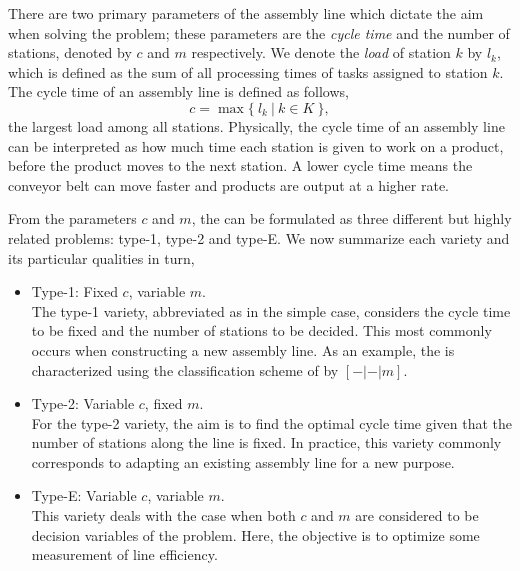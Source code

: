 There are two primary parameters of the assembly line
which dictate the aim when solving the problem; these parameters
are the \emph{cycle time} and the number of stations, denoted
by $c$ and $m$ respectively.
We denote the \emph{load} of station $k$ by $l_k$, which is
defined as the sum of all processing times of tasks assigned to station
$k$.
The cycle time of an assembly line is defined as follows,
\[
	c=\max\{ \: l_k \:|\: k \in K \:\},
\]
\ie the largest load among all stations.
Physically, the cycle time of an assembly
line can be interpreted as how much time each station is given to work on a product,
before the product moves to the next station.
A lower cycle time means the conveyor belt can move faster and
products are output at a higher rate.

From the parameters $c$ and $m$, the \albp{} can be formulated as three 
different but highly related problems: type-1, type-2 and
type-E.
We now summarize each variety and its particular qualities in turn,
\begin{itemize}
	\item Type-1: Fixed $c$, variable $m$.\\[1pt]
	The type-1 variety, abbreviated as  in the simple case, considers the
	cycle time to be fixed and the number of stations to be decided.
	This most commonly occurs when constructing a new assembly line.
	As an example, the  is characterized using the classification
	scheme of   by $[-|-|m]$.
	\item Type-2: Variable $c$, fixed $m$.\\[1pt]
	For the type-2 variety, the aim is to find the optimal cycle time given 
	that the number of stations along the line is fixed.
	In practice, this variety commonly corresponds to adapting an existing assembly line
	for a new purpose.
	\item Type-E: Variable $c$, variable $m$.\\[1pt]
	This variety deals with the case when both $c$ and $m$ are considered
	to be decision variables of the problem. Here, the objective
	is to optimize some measurement of line efficiency.
\end{itemize}

